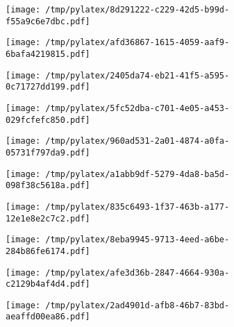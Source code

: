 \documentclass{article}
\begin{document}
\begin{figure}[htbp]
\begin{subfigure}[b]{.3\linewidth}
\texttt{[image: /tmp/pylatex/8d291222-c229-42d5-b99d-f55a9c6e7dbc.pdf]}
\end{subfigure}
\begin{subfigure}[b]{.3\linewidth}
\texttt{[image: /tmp/pylatex/afd36867-1615-4059-aaf9-6bafa4219815.pdf]}
\end{subfigure}
\begin{subfigure}[b]{.3\linewidth}
\texttt{[image: /tmp/pylatex/2405da74-eb21-41f5-a595-0c71727dd199.pdf]}
\end{subfigure}
\begin{subfigure}[b]{.3\linewidth}
\texttt{[image: /tmp/pylatex/5fc52dba-c701-4e05-a453-029fcfefc850.pdf]}
\end{subfigure}
\begin{subfigure}[b]{.3\linewidth}
\texttt{[image: /tmp/pylatex/960ad531-2a01-4874-a0fa-05731f797da9.pdf]}
\end{subfigure}
\begin{subfigure}[b]{.3\linewidth}
\texttt{[image: /tmp/pylatex/a1abb9df-5279-4da8-ba5d-098f38c5618a.pdf]}
\end{subfigure}
\begin{subfigure}[b]{.3\linewidth}
\texttt{[image: /tmp/pylatex/835c6493-1f37-463b-a177-12e1e8e2c7c2.pdf]}
\end{subfigure}
\begin{subfigure}[b]{.3\linewidth}
\texttt{[image: /tmp/pylatex/8eba9945-9713-4eed-a6be-284b86fe6174.pdf]}
\end{subfigure}
\begin{subfigure}[b]{.3\linewidth}
\texttt{[image: /tmp/pylatex/afe3d36b-2847-4664-930a-c2129b4af4d4.pdf]}
\end{subfigure}
\begin{subfigure}[b]{.3\linewidth}
\texttt{[image: /tmp/pylatex/2ad4901d-afb8-46b7-83bd-aeaffd00ea86.pdf]}
\end{subfigure}
\end{figure}
\end{document}
